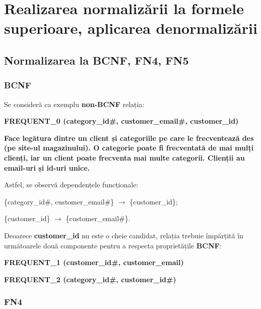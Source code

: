 \documentclass[a4paper, oneside, 12pt]{article}
\begin{document}
\section{Realizarea normalizării la formele superioare, aplicarea denormalizării}

\subsection{Normalizarea la \textbf{BCNF}, \textbf{FN4}, \textbf{FN5}}

\subsubsection{\textbf{BCNF}}

Se consideră ca exemplu \textbf{non-BCNF} relația:

\begin{m_itemize}
        \item \textbf{FREQUENT\_0 (category\_id\#, customer\_email\#, customer\_id)}
        \item \textbf{Face legătura dintre un client și categoriile pe care le
              frecventează des (pe site-ul magazinului).  O categorie poate
              fi frecventată de mai mulți clienți, iar un client poate frecventa mai
multe categorii. Clienții au email-uri și id-uri unice.}
\end{m_itemize}


Astfel, se observă dependențele funcționale:

\begin{m_itemize}
        \item \{category\_id\#, customer\_email\#\} $\rightarrow$ \{customer\_id\};
        \item \{customer\_id\} $\rightarrow$ \{customer\_email\#\}.
\end{m_itemize}

Deoarece \textbf{customer\_id} nu este o cheie candidat, relația trebuie
împărțită în următoarele două componente pentru a respecta proprietățile
\textbf{BCNF}:

\begin{m_itemize}
        \item \textbf{FREQUENT\_1 (customer\_id\#, customer\_email)}
        \item \textbf{FREQUENT\_2 (category\_id\#, customer\_id\#)}
\end{m_itemize}

\subsubsection{\textbf{FN4}}
\end{document}
